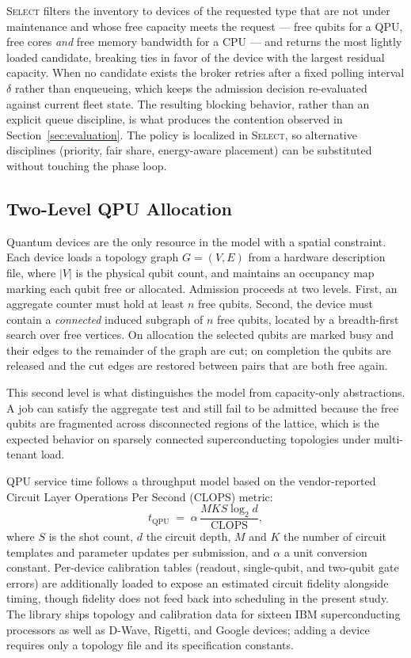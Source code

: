 \textsc{Select} filters the inventory to devices of the requested type that are
not under maintenance and whose free capacity meets the request --- free qubits
for a QPU, free cores \emph{and} free memory bandwidth for a CPU --- and
returns the most lightly loaded candidate, breaking ties in favor of the
device with the largest residual capacity. When no candidate exists the broker
retries after a fixed polling interval $\delta$ rather than enqueueing, which
keeps the admission decision re-evaluated against current fleet state. The
resulting blocking behavior, rather than an explicit queue discipline, is what
produces the contention observed in Section~\ref{sec:evaluation}. The policy is
localized in \textsc{Select}, so alternative disciplines (priority, fair share,
energy-aware placement) can be substituted without touching the phase loop.

\subsection{Two-Level QPU Allocation}
\label{sec:arch-qpu}

Quantum devices are the only resource in the model with a spatial constraint.
Each device loads a topology graph $G=(V,E)$ from a hardware description file,
where $|V|$ is the physical qubit count, and maintains an occupancy map marking
each qubit free or allocated. Admission proceeds at two levels. First, an
aggregate counter must hold at least $n$ free qubits. Second, the device must
contain a \emph{connected} induced subgraph of $n$ free qubits, located by a
breadth-first search over free vertices. On allocation the selected qubits are
marked busy and their edges to the remainder of the graph are cut; on
completion the qubits are released and the cut edges are restored between pairs
that are both free again.

This second level is what distinguishes the model from capacity-only
abstractions. A job can satisfy the aggregate test and still fail to be
admitted because the free qubits are fragmented across disconnected regions of
the lattice, which is the expected behavior on sparsely connected
superconducting topologies under multi-tenant load.

QPU service time follows a throughput model based on the vendor-reported
Circuit Layer Operations Per Second (CLOPS) metric:
\begin{equation}
\label{eq:qpu-time}
t_{\mathrm{QPU}} \;=\; \alpha\,\frac{M K S \log_2 d}{\mathrm{CLOPS}},
\end{equation}
where $S$ is the shot count, $d$ the circuit depth, $M$ and $K$ the number of
circuit templates and parameter updates per submission, and $\alpha$ a unit
conversion constant. Per-device calibration tables (readout, single-qubit, and
two-qubit gate errors) are additionally loaded to expose an estimated circuit
fidelity alongside timing, though fidelity does not feed back into scheduling
in the present study. The library ships topology and calibration data for
sixteen IBM superconducting processors as well as D-Wave, Rigetti, and Google
devices; adding a device requires only a topology file and its specification
constants.

